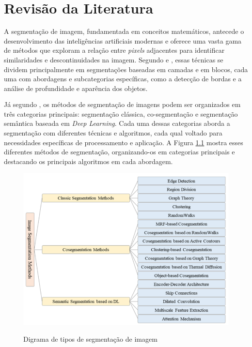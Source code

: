 \chapter{Revisão da Literatura}
\label{cap:02}

A segmentação de imagem, fundamentada em conceitos matemáticos, antecede o desenvolvimento das inteligências artificiais modernas e oferece uma vasta gama de métodos que exploram a relação entre \textit{pixels} adjacentes para identificar similaridades e descontinuidades na imagem. Segundo  e , essas técnicas se dividem principalmente em segmentações baseadas em camadas e em blocos, cada uma com abordagens e subcategorias específicas, como a detecção de bordas e a análise de profundidade e aparência dos objetos.

Já segundo , os métodos de segmentação de imagens podem ser organizados em três categorias principais: segmentação clássica, co-segmentação e segmentação semântica baseada em \textit{Deep Learning}. Cada uma dessas categorias aborda a segmentação com diferentes técnicas e algoritmos, cada qual voltado para necessidades específicas de processamento e aplicação. A Figura \ref{fig:segmentacao} mostra esses diferentes métodos de segmentação, organizando-os em categorias principais e destacando os principais algoritmos em cada abordagem.

\FloatBarrier
\begin{figure}[ht]
    \caption{Digrama de tipos de segmentação de imagem}
    \centering
    \includegraphics[scale=0.6]{imagens/metodos_segmentacao.png}
    \label{fig:segmentacao}
\end{figure}
\FloatBarrier

